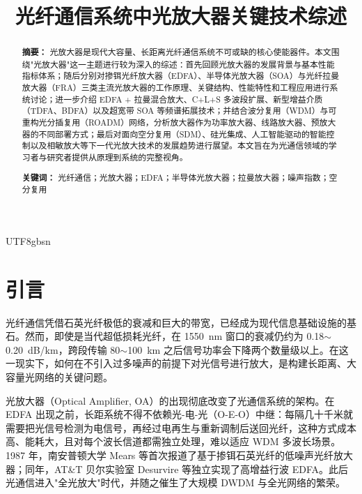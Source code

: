 \documentclass[11pt,a4paper]{article}
\begin{document}
\begin{CJK}{UTF8}{gbsn}

\title{\bfseries 光纤通信系统中光放大器关键技术综述}
\author{}
\date{}
\maketitle

\begin{abstract}
\noindent\textbf{摘要：} 光放大器是现代大容量、长距离光纤通信系统不可或缺的核心使能器件。本文围绕"光放大器"这一主题进行较为深入的综述：首先回顾光放大器的发展背景与基本性能指标体系；随后分别对掺铒光纤放大器（EDFA）、半导体光放大器（SOA）与光纤拉曼放大器（FRA）三类主流光放大器的工作原理、关键结构、性能特性和工程应用进行系统讨论；进一步介绍 EDFA + 拉曼混合放大、C+L+S 多波段扩展、新型增益介质（TDFA、BDFA）以及超宽带 SOA 等频谱拓展技术；并结合波分复用（WDM）与可重构光分插复用（ROADM）网络，分析放大器作为功率放大器、线路放大器、预放大器的不同部署方式；最后对面向空分复用（SDM）、硅光集成、人工智能驱动的智能控制以及相敏放大等下一代光放大技术的发展趋势进行展望。本文旨在为光通信领域的学习者与研究者提供从原理到系统的完整视角。

\vspace{4pt}
\noindent\textbf{关键词：} 光纤通信；光放大器；EDFA；半导体光放大器；拉曼放大器；噪声指数；空分复用
\end{abstract}

\section{引言}

光纤通信凭借石英光纤极低的衰减和巨大的带宽，已经成为现代信息基础设施的基石。然而，即使是当代超低损耗光纤，在 1550~nm 窗口的衰减仍约为 0.18$\sim$0.20~dB/km，跨段传输 80$\sim$100~km 之后信号功率会下降两个数量级以上。在这一现实下，如何在不引入过多噪声的前提下对光信号进行放大，是构建长距离、大容量光网络的关键问题。

光放大器（Optical Amplifier, OA）的出现彻底改变了光通信系统的架构。在 EDFA 出现之前，长距系统不得不依赖光-电-光（O-E-O）中继：每隔几十千米就需要把光信号检测为电信号，再经过电再生与重新调制后送回光纤，这种方式成本高、能耗大，且对每个波长信道都需独立处理，难以适应 WDM 多波长场景。1987 年，南安普顿大学 Mears 等首次报道了基于掺铒石英光纤的低噪声光纤放大器\cite{mears1987}；同年，AT\&T 贝尔实验室 Desurvire 等独立实现了高增益行波 EDFA\cite{desurvire1987}。此后光通信进入"全光放大"时代，并随之催生了大规模 DWDM 与全光网络的繁荣\cite{becker1999}。


\end{CJK}
\end{document}
